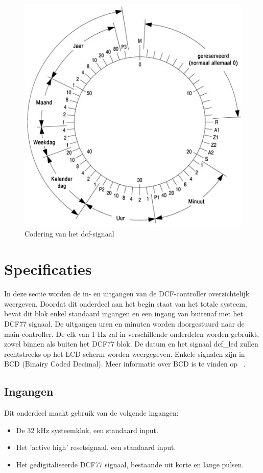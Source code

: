 \begin{figure}[h!]
\center
\includegraphics[scale=1.9]{Figuren/DCF77/dcf77coding.png}
\caption{Codering van het dcf-signaal~\cite{Tijdscodering}}
\label{fig:dcfsignaal}
\end{figure}

\section{Specificaties}
In deze sectie worden de in- en uitgangen van de DCF-controller overzichtelijk weergeven. Doordat dit onderdeel aan het begin staat van het totale systeem, bevat dit blok enkel standaard ingangen en een ingang van buitenaf met het DCF77 signaal. De uitgangen uren en minuten worden doorgestuurd naar de main-controller. De clk van 1 Hz zal in verschillende onderdelen worden gebruikt, zowel binnen als buiten het DCF77 blok. De datum en het signaal dcf\_led zullen rechtstreeks op het LCD scherm worden weergegeven. Enkele signalen zijn in BCD (Binairy Coded Decimal). Meer informatie over BCD is te vinden op ~\cite{BCDinfo}.

\subsection{Ingangen}
Dit onderdeel maakt gebruik van de volgende ingangen: 
\begin{itemize}[nolistsep]
\item De 32 kHz systeemklok, een standaard input.
\item Het 'active high' resetsignaal, een standaard input.
\item Het gedigitaliseerde DCF77 signaal, bestaande uit korte en lange pulsen.
\end{itemize}
\noindent

